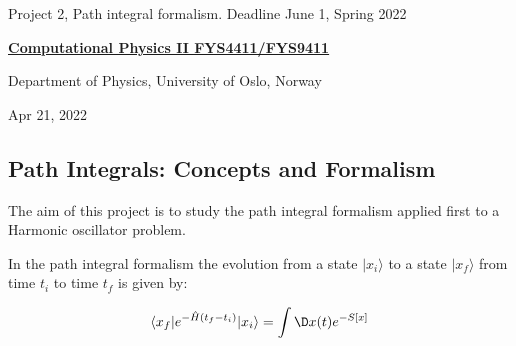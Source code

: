 \documentclass[%
oneside,                 %
final,                   %
10pt]{article}
\begin{document}

\newcommand{\exercisesection}[1]{\subsection*{#1}}






\thispagestyle{empty}

\begin{center}
{\LARGE\bf
\begin{spacing}{1.25}
Project 2, Path integral formalism. Deadline June 1, Spring 2022
\end{spacing}
}
\end{center}


\begin{center}
{\bf \href{{http://www.uio.no/studier/emner/matnat/fys/FYS4411/index-eng.html}}{Computational Physics II FYS4411/FYS9411}}
\end{center}

    \begin{center}
\centerline{{\small Department of Physics, University of Oslo, Norway}}
\end{center}
    

\begin{center}
Apr 21, 2022
\end{center}

\vspace{1cm}


\subsection*{Path Integrals: Concepts and Formalism}

The aim of this project is to study the path integral formalism applied first to a Harmonic oscillator problem.

In the path integral formalism the evolution from a state $\vert x_i\rangle$
to a state $\vert  x_f\rangle$ from time $t_i$ to time $t_f$ is given by:

\[
	\langle x_f\vert e^{-\hat{H}(t_f-t_i)}\vert x_i\rangle = \int \D x(t) e^{-S[x]}
\]
\end{document}
